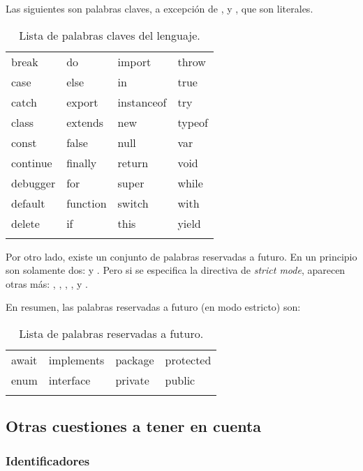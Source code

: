 Las siguientes son palabras claves, a excepción de ,  y , que son literales.

\begin{table}[!h]
\caption{Lista de palabras claves del lenguaje.}
\label{tab:reservedkeywords}
\centering
\begin{tabular}{l l l l}
\toprule
break & do & import & throw\\
case & else & in & true\\
catch & export & instanceof & try\\
class & extends & new & typeof\\
const & false & null & var\\
continue & finally & return & void\\
debugger & for & super & while\\
default & function & switch & with\\
delete & if & this & yield\\
\bottomrule\\
\end{tabular}
\end{table}

Por otro lado, existe un conjunto de palabras reservadas a futuro. En un principio son solamente dos:  y . Pero si se especifica la directiva de \textit{strict mode}, aparecen otras más: , , , ,  y .

En resumen, las palabras reservadas a futuro (en modo estricto) son:

\begin{table}[!h]
\caption{Lista de palabras reservadas a futuro.}
\label{tab:futurereservedkeywords}
\centering
\begin{tabular}{l l l l}
\toprule
await & implements & package & protected\\
enum & interface & private & public\\
\bottomrule\\
\end{tabular}
\end{table}

\subsection{Otras cuestiones a tener en cuenta}

\subsubsection{Identificadores}

